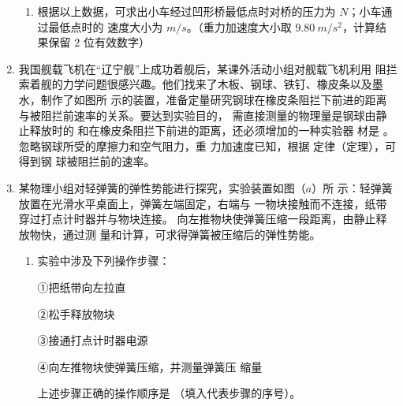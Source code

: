 \begin{enumerate}
\begin{enumerate}
\item 
根据以上数据，可求出小车经过凹形桥最低点时对桥的压力为  $ N $；小车通过最低点时的
速度大小为  $ m/s $。（重力加速度大小取 $ 9.80 \ m/s^{2} $，计算结果保留 $ 2 $ 位有效数字）


\end{enumerate}





\item
{}
我国舰载飞机在“辽宁舰”上成功着舰后，某课外活动小组对舰载飞机利用
阻拦索着舰的力学问题很感兴趣。他们找来了木板、钢球、铁钉、橡皮条以及墨水，制作了如图所
示的装置，准备定量研究钢球在橡皮条阻拦下前进的距离与被阻拦前速率的关系。要达到实验目的，
需直接测量的物理量是钢球由静止释放时的
和在橡皮条阻拦下前进的距离，还必须增加的一种实验器
材是
。忽略钢球所受的摩擦力和空气阻力，重
力加速度已知，根据
定律（定理），可得到钢
球被阻拦前的速率。
\begin{figure}[h!]
\centering

\end{figure}


\newpage
\item 
{}
某物理小组对轻弹簧的弹性势能进行探究，实验装置如图（$ a $）所
示：轻弹簧放置在光滑水平桌面上，弹簧左端固定，右端与
一物块接触而不连接，纸带穿过打点计时器并与物块连接。
向左推物块使弹簧压缩一段距离，由静止释放物快，通过测
量和计算，可求得弹簧被压缩后的弹性势能。
\begin{figure}[h!]
\centering

\end{figure}

\begin{enumerate}
\renewcommand{\labelenumi}{\arabic{enumi}.}
\item
实验中涉及下列操作步骤：

①把纸带向左拉直

②松手释放物块

③接通打点计时器电源


④向左推物块使弹簧压缩，并测量弹簧压
缩量

上述步骤正确的操作顺序是  
（填入代表步骤的序号）。



\end{enumerate}
\end{enumerate}
